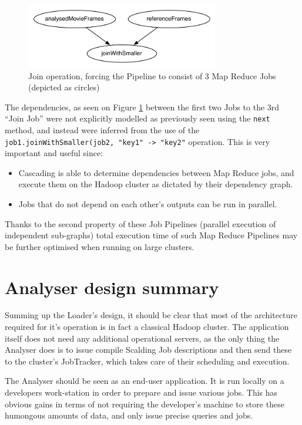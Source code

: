\begin{figure}[ch!]
  \centering
  \includegraphics[width=0.75\textwidth]{img/second-simplest-pipeline}
  \caption{Join operation, forcing the Pipeline to consist of 3 Map Reduce Jobs (depicted as circles)}
  \label{fig:3-pipeline}
\end{figure}


The dependencies, as seen on Figure \ref{fig:3-pipeline} between the first two Jobs to the 3rd ``Join Job'' were not explicitly modelled as previously seen using the \verb|next| method, and instead were inferred from the use of the \verb|job1.joinWithSmaller(job2, "key1" -> "key2"| operation. This is very important and useful since:

\begin{itemize}
  \item Cascading is able to determine dependencies between Map Reduce jobs, and execute them on the Hadoop cluster as dictated by their dependency graph.
  \item Jobs that do not depend on each other's outputs can be run in parallel.
\end{itemize}

Thanks to the second property of these Job Pipelines (parallel execution of independent sub-graphs) total execution time of such Map Reduce Pipelines may be further optimised when running on large clusters.

\section{Analyser design summary}
Summing up the Loader's design, it should be clear that most of the architecture required for it's operation is in fact a classical Hadoop cluster. The application itself does not need any additional operational servers, as the only thing the Analyser does is to issue compile Scalding Job descriptions and then send these to the cluster's JobTracker, which takes care of their scheduling and execution. 

The Analyser should be seen as an end-user application. It is run locally on a developers work-station in order to prepare and issue various jobs. This has obvious gains in terms of not requiring the developer's machine to store these humongous amounts of data, and only issue precise queries and jobs.







